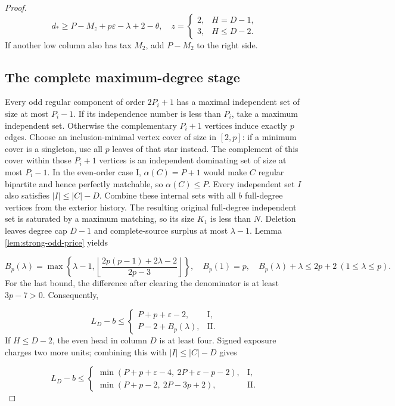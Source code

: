 \documentclass[11pt,a4paper]{article}
\newcommand{\floor}[1]{\left\lfloor#1\right\rfloor}
\theoremstyle{definition}
\begin{document}
\begin{proof}
\begin{equation}\label{eq:regular-tax}
d_*\ge P-M_z+p\varepsilon-\lambda+2-\theta,
\quad
z=\begin{cases}2,&H=D-1,\\3,&H\le D-2.\end{cases}
\end{equation}
If another low column also has tax $M_2$, add $P-M_2$ to the right side.

\subsection*{The complete maximum-degree stage}
Every odd regular component of order $2P_i+1$ has a maximal independent
set of size at most $P_i-1$.
If its independence number is less than $P_i$, take a maximum independent set.
Otherwise the complementary $P_i+1$ vertices induce exactly $p$ edges.
Choose an inclusion-minimal vertex cover of size in $[2,p]$:
if a minimum cover is a singleton, use all $p$ leaves of that star instead.
The complement of this cover within those $P_i+1$ vertices is an
independent dominating set of size at most $P_i-1$.
In the even-order case I, $\alpha(C)=P+1$ would make $C$ regular bipartite
and hence perfectly matchable, so $\alpha(C)\le P$.
Every independent set $I$ also satisfies $|I|\le|C|-D$.
Combine these internal sets with all $b$ full-degree vertices from the exterior history.
The resulting original full-degree independent set is saturated by a maximum matching,
so its size $K_1$ is less than $N$.
Deletion leaves degree cap $D-1$ and complete-source surplus at most $\lambda-1$.
Lemma \ref{lem:strong-odd-price} yields

\[
B_p(\lambda)=\max\left\{\lambda-1,
\floor{\frac{2p(p-1)+2\lambda-2}{2p-3}}\right\},
\quad B_p(1)=p,\quad B_p(\lambda)+\lambda\le2p+2\ (1\le\lambda\le p).
\]
For the last bound, the difference after clearing the denominator
is at least $3p-7>0$. Consequently,

\begin{equation}\label{eq:regular-first-stage}
L_D-b\le
\begin{cases}P+p+\varepsilon-2,&\mathrm I,\\
P-2+B_p(\lambda),&\mathrm {II}.
\end{cases}
\end{equation}
If $H\le D-2$, the even head in column $D$ is at least four.
Signed exposure charges two more units; combining this with $|I|\le|C|-D$ gives

\begin{equation}\label{eq:regular-first-strong}
L_D-b\le
\begin{cases}
\min(P+p+\varepsilon-4,\ 2P+\varepsilon-p-2),&\mathrm I,\\
\min(P+p-2,\ 2P-3p+2),&\mathrm {II}.
\end{cases}
\end{equation}

\end{proof}
\end{document}
